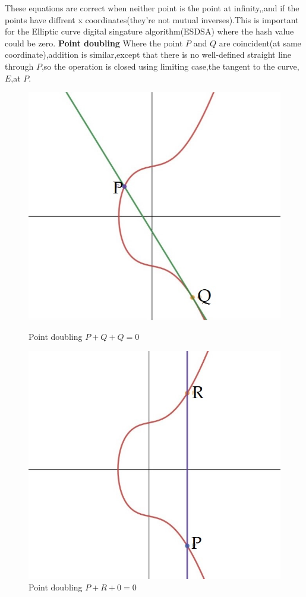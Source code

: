 \documentclass{article}
\begin{document}
These equations are correct when neither point is the point at infinity,{},and if the points have diffrent x coordinates(they're not mutual inverses).This is important for the Elliptic curve digital singature algorithm(ESDSA) where the hash value could be zero.
\newpage
\textbf{Point doubling}
\newline
Where the point $P$ and $Q$ are coincident(at same coordinate),addition is similar,except that there is no well-defined straight line through $P$,so the operation is closed using limiting case,the tangent to the curve,$E$,at $P$.
\begin{figure}[hb]
  \centering
  \begin{minipage}[hb]{0.3\textwidth}
    \includegraphics[width=\textwidth]{PQ.jpeg}
    \caption{Point doubling \(P+Q+Q=0\)}
  \end{minipage}
  \hfill
  \begin{minipage}[hb]{0.3\textwidth}
    \includegraphics[width=\textwidth]{PR.jpeg}
    \caption{Point doubling \(P+R+0=0\)}
  \end{minipage}
  \hfill
\end{figure}
\end{document}
